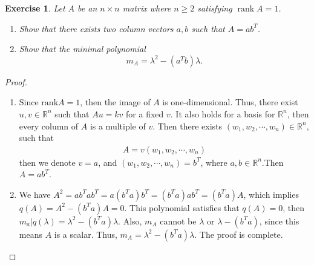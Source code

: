 \documentclass[11pt]{book}
\newtheorem{exercise}{Exercise}[section]
\theoremstyle{definition}
\numberwithin{equation}{chapter}
\begin{document}
\medskip

\begin{exercise}
Let $A$ be an $n\times n$ matrix where $n\geq2$ satisfying
$\operatorname*{rank}A=1$.
\begin{enumerate}[label=(\alph*)]
    \item Show that there exists two column vectors $a,b$ such that $A=ab^{T}$.
    \item Show that the minimal polynomial
    $$m_{A}=\lambda^{2}-\left(  a^{T}b\right)  \lambda.$$
\end{enumerate}
\end{exercise}
\begin{proof}
~\begin{enumerate}[label=(\alph*)]
    \item Since $\text{rank}A=1$, then the image of $A$ is one-dimensional. Thus, there exist $u,v\in \mathbb{R}^n$ such that $Au=kv$ for a fixed $v$. It also holds for a basis for $\mathbb{R}^n$, then every column of $A$ is a multiple of $v$. Then there exists $(w_1, w_2,\cdots,w_n)\in\mathbb{R}^n$, such that
    \begin{align*}
        A=v(w_1, w_2,\cdots,w_n)
    \end{align*}
    then we denote $v=a$, and $(w_1, w_2, \cdots, w_n) = b^T$, where $a,b\in\mathbb{R}^n$.Then $A=ab^T$.
    \item We have $A^2 = ab^Tab^T = a(b^Ta)b^T = (b^Ta)ab^T = (b^Ta)A$, which implies $q(A)=A^2-(b^Ta)A=0$. This polynomial satisfies that $q(A)=0$, then $m_a|q(\lambda) = \lambda^2-(b^Ta)\lambda$. Also, $m_A$ cannot be $\lambda$ or $\lambda-(b^Ta)$, since this means $A$ is a scalar. Thus, $m_A = \lambda^2-(b^Ta)\lambda$. The proof is complete.
\end{enumerate}
\end{proof}

\medskip
\end{document}
